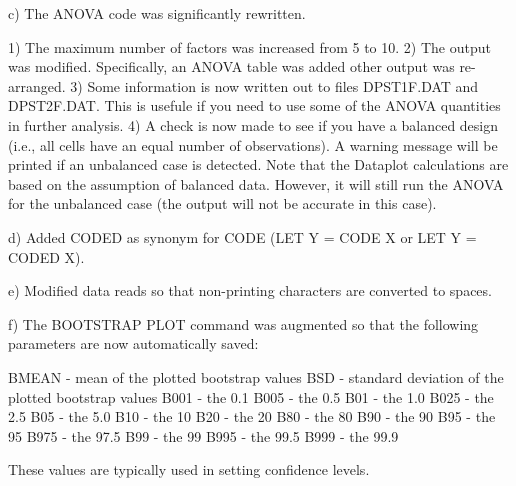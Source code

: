 {    c) The ANOVA code was significantly rewritten.
   
       1) The maximum number of factors was increased from 5 to 10.
       2) The output was modified.  Specifically, an ANOVA table was
          added other output was re-arranged.
       3) Some information is now written out to files DPST1F.DAT
          and DPST2F.DAT.  This is usefule if you need to use some
          of the ANOVA quantities in further analysis.
       4) A check is now made to see if you have a balanced design
          (i.e., all cells have an equal number of observations).
          A warning message will be printed if an unbalanced case is
          detected.  Note that the Dataplot calculations are based on
          the assumption of balanced data.  However, it will still
          run the ANOVA for the unbalanced case (the output will
          not be accurate in this case).
   
    d) Added CODED as synonym for CODE (LET Y = CODE X or
       LET Y = CODED X).
   
    e) Modified data reads so that non-printing characters are
       converted to spaces.
   
    f) The BOOTSTRAP PLOT command was augmented so that the following
       parameters are now automatically saved:
   
          BMEAN  - mean of the plotted bootstrap values
          BSD    - standard deviation of the plotted bootstrap values
          B001   - the 0.1%
          B005   - the 0.5%
          B01    - the 1.0%
          B025   - the 2.5%
          B05    - the 5.0%
          B10    - the 10%
          B20    - the 20%
          B80    - the 80%
          B90    - the 90%
          B95    - the 95%
          B975   - the 97.5%
          B99    - the 99%
          B995   - the 99.5%
          B999   - the 99.9%
   
      These values are typically used in setting confidence levels.
   
}
